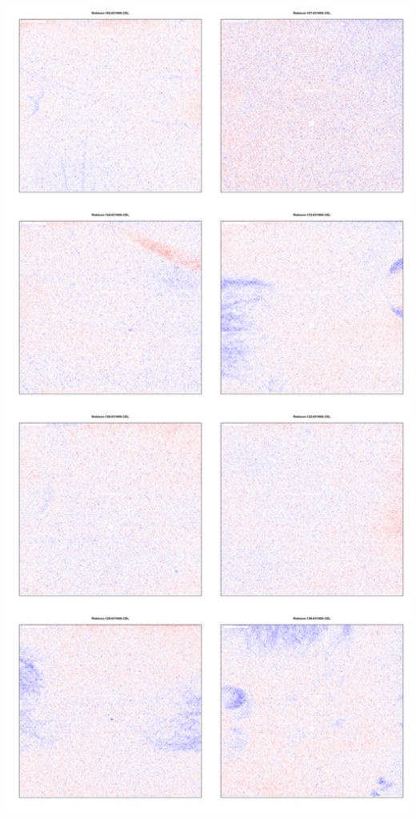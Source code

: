 \documentclass[pdf]{beamer}
\begin{document}
\begin{frame}
\begin{columns}[t]
\begin{column}[T]{5cm}
        \includegraphics[scale=0.09]{figures/resid0.png} 
     \end{column}
  \end{columns}
\end{frame}
\end{document}
